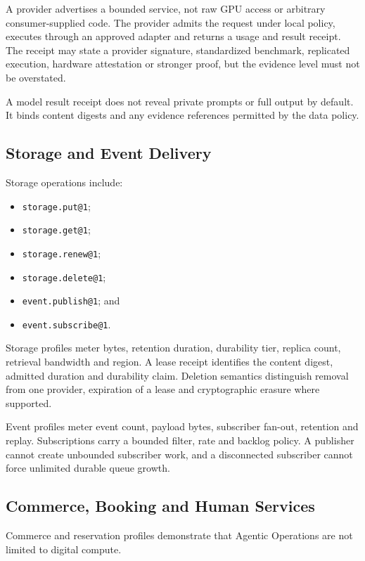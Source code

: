 \documentclass[11pt,oneside]{article}
\newcommand{\opid}[1]{\texttt{#1}}
\begin{document}
A provider advertises a bounded service, not raw GPU access or arbitrary consumer-supplied
code. The provider admits the request under local policy, executes through an approved adapter
and returns a usage and result receipt. The receipt may state a provider signature,
standardized benchmark, replicated execution, hardware attestation or stronger proof, but the
evidence level must not be overstated.

A model result receipt does not reveal private prompts or full output by default. It binds
content digests and any evidence references permitted by the data policy.

\subsection{Storage and Event Delivery}

Storage operations include:

\begin{itemize}
  \item \opid{storage.put@1};
  \item \opid{storage.get@1};
  \item \opid{storage.renew@1};
  \item \opid{storage.delete@1};
  \item \opid{event.publish@1}; and
  \item \opid{event.subscribe@1}.
\end{itemize}

Storage profiles meter bytes, retention duration, durability tier, replica count, retrieval
bandwidth and region. A lease receipt identifies the content digest, admitted duration and
durability claim. Deletion semantics distinguish removal from one provider, expiration of a
lease and cryptographic erasure where supported.

Event profiles meter event count, payload bytes, subscriber fan-out, retention and replay.
Subscriptions carry a bounded filter, rate and backlog policy. A publisher cannot create
unbounded subscriber work, and a disconnected subscriber cannot force unlimited durable
queue growth.

\subsection{Commerce, Booking and Human Services}

Commerce and reservation profiles demonstrate that Agentic Operations are not limited to
digital compute.
\end{document}

